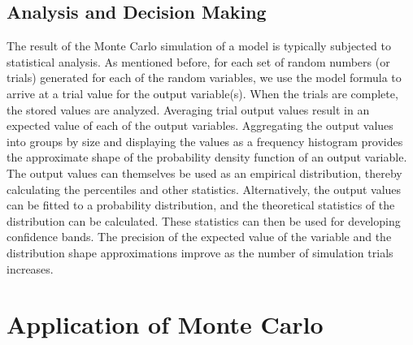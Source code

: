 \documentclass[12pt]{article}
\begin{document}
    \subsection{Analysis and Decision Making}
    The result of the Monte Carlo simulation of a model is
typically subjected to statistical analysis. As mentioned
before, for each set of random numbers (or trials) generated
for each of the random variables, we use the model formula
to arrive at a trial value for the output variable(s). When the
trials are complete, the stored values are analyzed. Averaging trial output values result in an expected
value of each of the output variables. Aggregating the
output values into groups by size and displaying the values
as a frequency histogram provides the approximate shape
of the probability density function of an output variable.
The output values can themselves be used as an empirical
distribution, thereby calculating the percentiles and other
statistics. Alternatively, the output values can be fitted to a
probability distribution, and the theoretical statistics of the
distribution can be calculated. These statistics can then be
used for developing confidence bands. The precision of the
expected value of the variable and the distribution shape
approximations improve as the number of simulation trials
increases.
    \section{Application of Monte Carlo}
\end{document}
